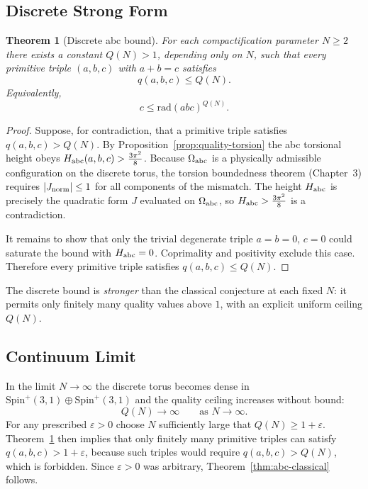 \documentclass[dvipdfmx,a4paper]{article}
\newtheorem{theorem}{Theorem}[section]
\theoremstyle{definition}
\theoremstyle{remark}
\newcommand{\Jnorm}{J_{\rm norm}}
\newcommand{\Jbound}{\frac{3\pi^2}{8}}
\begin{document}
\subsection{Discrete Strong Form}

\begin{theorem}[Discrete abc bound]
\label{thm:discrete-abc}
For each compactification parameter \( N \geq 2 \) there exists a constant \( Q(N) > 1 \), depending only on \( N \), such that every primitive triple \( (a,b,c) \) with \( a + b = c \) satisfies
\[
q(a,b,c) \leq Q(N).
\]
Equivalently,
\[
c \leq \mathrm{rad}(abc)^{Q(N)}.
\]
\end{theorem}

\begin{proof}
Suppose, for contradiction, that a primitive triple satisfies \( q(a,b,c) > Q(N) \). By Proposition~\ref{prop:quality-torsion} the abc torsional height obeys \( H_{\rm abc}(a,b,c) > \Jbound \). Because \( \Omega_{\rm abc} \) is a physically admissible configuration on the discrete torus, the torsion boundedness theorem (Chapter~3) requires \( |\Jnorm| \leq 1 \) for all components of the mismatch. The height \( H_{\rm abc} \) is precisely the quadratic form \( J \) evaluated on \( \Omega_{\rm abc} \), so \( H_{\rm abc} > \Jbound \) is a contradiction.

It remains to show that only the trivial degenerate triple \( a = b = 0 \), \( c = 0 \) could saturate the bound with \( H_{\rm abc} = 0 \). Coprimality and positivity exclude this case. Therefore every primitive triple satisfies \( q(a,b,c) \leq Q(N) \).
\end{proof}

The discrete bound is \emph{stronger} than the classical conjecture at each fixed \( N \): it permits only finitely many quality values above \( 1 \), with an explicit uniform ceiling \( Q(N) \).

\subsection{Continuum Limit}

In the limit \( N \to \infty \) the discrete torus becomes dense in \( \mathrm{Spin}^+(3,1) \oplus \mathrm{Spin}^+(3,1) \) and the quality ceiling increases without bound:
\[
Q(N) \to \infty \qquad \text{as } N \to \infty.
\]
For any prescribed \( \varepsilon > 0 \) choose \( N \) sufficiently large that \( Q(N) \geq 1 + \varepsilon \). Theorem~\ref{thm:discrete-abc} then implies that only finitely many primitive triples can satisfy \( q(a,b,c) > 1 + \varepsilon \), because such triples would require \( q(a,b,c) > Q(N) \), which is forbidden. Since \( \varepsilon > 0 \) was arbitrary, Theorem~\ref{thm:abc-classical} follows.
\end{document}
